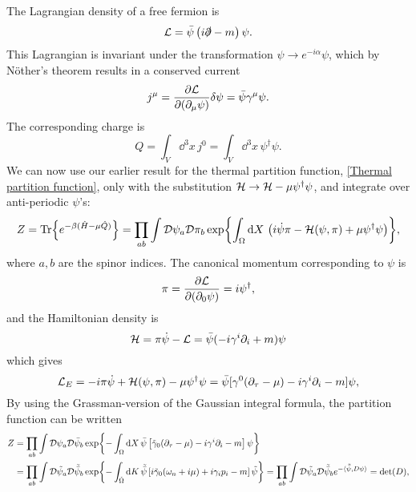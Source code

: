 The Lagrangian density of a free fermion is
\begin{equation}
    \mathcal{L} = \bar \psi \left( i \slashed{\partial} - m \right) \psi.
\end{equation}
This Lagrangian is invariant under the transformation $\psi \rightarrow e^{-i \alpha} \psi$, which by Nöther's theorem results in a conserved current
\begin{equation}
    j^\mu = \pdv{\mathcal{L}}{(\partial_\mu \psi)} \delta \psi=  \bar \psi \gamma^\mu \psi.
\end{equation}
The corresponding charge is 
\begin{equation}
    Q = \int_V \dd^3 x\, j^0 = \int_V \dd^3 x \, \psi^\dagger \psi.
\end{equation}
We can now use our earlier result for the thermal partition function, \autoref{Thermal partition function}, only with the substitution $\mathcal{H} \rightarrow \mathcal{H} - \mu \psi^\dagger \psi$, and integrate over anti-periodic $\psi$'s:
\begin{equation*}
    Z = \Tr{e^{-\beta(\hat H - \mu \hat Q)}}
    = \prod_{a b}\int \mathcal{D} \psi_a\mathcal{D} \pi_b \exp{
        \int_{\Omega} \dd X \, 
        \left(
            i\dot \psi \pi - \mathcal{H}(\psi, \pi) + \mu \psi^\dagger \psi
        \right)
    },
\end{equation*}
where $a, b$ are the spinor indices.
The canonical momentum corresponding to $\psi$ is
\begin{equation}
    \pi = \pdv{\mathcal{L}}{(\partial_0 \psi)} = i \psi^\dagger,
\end{equation}
and the Hamiltonian density is 
\begin{equation}
    \mathcal{H} = \pi \dot\psi - \mathcal{L}
    = \bar \psi ( - i\gamma^i\partial_i + m) \psi
\end{equation}
which gives
\begin{equation}
    \mathcal{L}_E = 
    - i \pi \dot\psi + \mathcal{H}(\psi, \pi) - \mu \psi^\dagger \psi
    = \bar\psi[\gamma^0 (\partial_\tau - \mu) - i\gamma^i \partial_i - m] \psi,
\end{equation}
By using the Grassman-version of the Gaussian integral formula, the partition function can be written
\begin{align*}
    Z & = \prod_{a b}\int \mathcal{D} \psi_a\mathcal{D} \bar \psi_b 
    \exp{
        - \int_\Omega \dd X \, \bar \psi
        \left[
            \tilde\gamma_0(\partial_\tau -\mu) -  i \gamma^i \partial_i - m
        \right]
        \psi
    }\\
    & = \prod_{a b}\int \mathcal{D} \tilde \psi_a\mathcal{D} \tilde {\bar \psi}_b 
    \exp{
        - \int_{\tilde \Omega} \dd K \, \tilde {\bar \psi}
        \left[
            i \tilde\gamma_0(\omega_n + i\mu) + i \gamma_i p_i - m
        \right]
        \tilde \psi
    }
    = \prod_{a b}\int \mathcal{D} \tilde \psi_a\mathcal{D} \tilde {\bar \psi}_b 
    e^{- \langle \tilde {\bar \psi}, D \psi\rangle} 
    = \det(D),
\end{align*}
